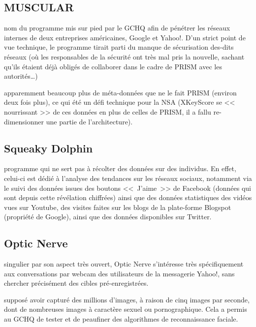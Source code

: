 \subsection{MUSCULAR}

 nom du programme mis sur pied par le GCHQ afin de
pénétrer les réseaux internes de deux entreprises américaines, Google et Yahoo!.
D'un strict point de vue technique, le programme tirait parti du manque de
sécurisation des-dits réseaux\autocite{echange}\autocite{Yahoo} (où les responsables de
la sécurité ont très mal pris la nouvelle, sachant qu'ils étaient déjà obligés de collaborer
dans le cadre de PRISM avec les autorités\ldots)

 apparemment beaucoup plus de méta-données que
ne le fait PRISM (environ deux fois plus\autocite{echange}), ce qui été un défi
technique pour la NSA (XKeyScore se << nourrissant >> de ces données en plus de
celles de PRISM, il a fallu re-dimensionner une partie de l'architecture).

\subsection{Squeaky Dolphin}

 programme qui ne sert pas à récolter des données
sur des individus. En effet, celui-ci est dédié à l'analyse des tendances sur
les réseaux sociaux, notamment via le suivi des données issues des boutons
<<~J'aime~>> de Facebook (données qui sont depuis cette révélation
chiffrées\autocite{fbenc}) ainsi que des données statistiques des vidéos vues sur
Youtube, des visites faites sur les blogs de la plate-forme Blogspot (propriété
de Google), ainsi que des données disponibles sur Twitter.

\newpage
\subsection{Optic Nerve}

 singulier par son aspect très ouvert, Optic Nerve
s'intéresse très spécifiquement aux conversations par webcam des utilisateurs de
la messagerie Yahoo!\autocite{yahoocam}, sans chercher précisément des cibles
pré-enregistrées.

 supposé avoir capturé des millions d'images, à
raison de cinq images par seconde\autocite{latribune}, dont de nombreuses images à
caractère sexuel ou pornographique. Cela a permis au GCHQ de tester et de
peaufiner des algorithmes de reconnaissance faciale.

